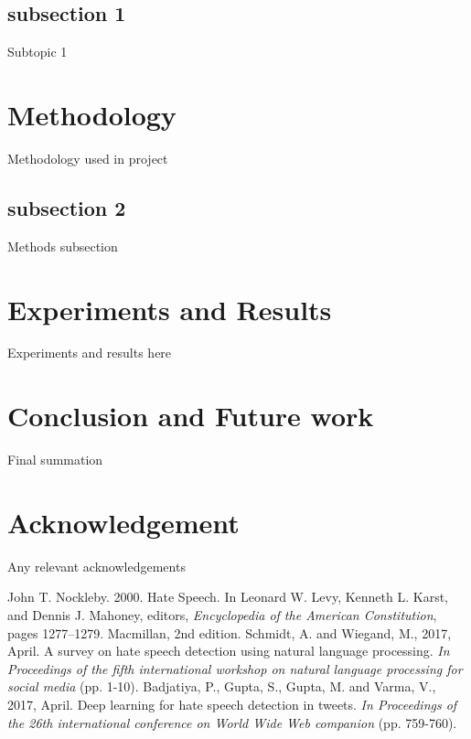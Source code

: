\documentclass[conference]{IEEEtran}
\begin{document}
\subsection{subsection 1}
Subtopic 1

\section{Methodology}
Methodology used in project

\subsection{subsection 2}\label{AA}
Methods subsection

\section{Experiments and Results}
Experiments and results here

\section{Conclusion and Future work}
Final summation

\section*{Acknowledgement}

Any relevant acknowledgements

\begin{thebibliography}{00}
 John T. Nockleby. 2000. Hate Speech. In Leonard W.
Levy, Kenneth L. Karst, and Dennis J. Mahoney,
editors, \textit{Encyclopedia of the American Constitution},
pages 1277–1279. Macmillan, 2nd edition.
 Schmidt, A. and Wiegand, M., 2017, April. A survey on hate speech detection using natural language processing. \textit{In Proceedings of the fifth international workshop on natural language processing for social media} (pp. 1-10).
 Badjatiya, P., Gupta, S., Gupta, M. and Varma, V., 2017, April. Deep learning for hate speech detection in tweets. \textit{In Proceedings of the 26th international conference on World Wide Web companion} (pp. 759-760).
\end{thebibliography}
\vspace{12pt}
\end{document}
